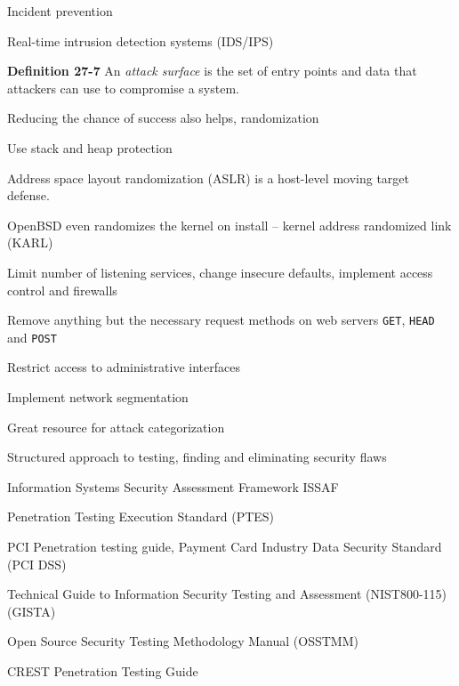 \documentclass[Screen16to9,17pt]{foils}
\begin{document}

\begin{list2}
\item Incident prevention
\item Real-time intrusion detection systems (IDS/IPS)
\item {\bf Definition 27-7} An \emph{attack surface} is the set of entry points and data that attackers can use to compromise a system.
\item Reducing the chance of success also helps, randomization
\item Use stack and heap protection
\item Address space layout randomization (ASLR) is a host-level moving target defense.
\item OpenBSD even randomizes the kernel on install -- kernel address randomized link (KARL)
\item Limit number of listening services, change insecure defaults, implement access control and firewalls
\item Remove anything but the necessary request methods on web servers \verb+GET+, \verb+HEAD+ and \verb+POST+
\item Restrict access to administrative interfaces
\item Implement network segmentation
\end{list2}





Great resource for attack categorization




\begin{list2}
\item Structured approach to testing, finding and eliminating security flaws
\item Information Systems Security Assessment Framework ISSAF
\item Penetration Testing Execution Standard (PTES)
\item PCI Penetration testing guide, Payment Card Industry Data Security Standard (PCI DSS)
\item Technical Guide to Information Security Testing and Assessment (NIST800-115) (GISTA)
\item Open Source Security Testing Methodology Manual (OSSTMM)
\item CREST Penetration Testing Guide
\end{list2}
\end{document}
